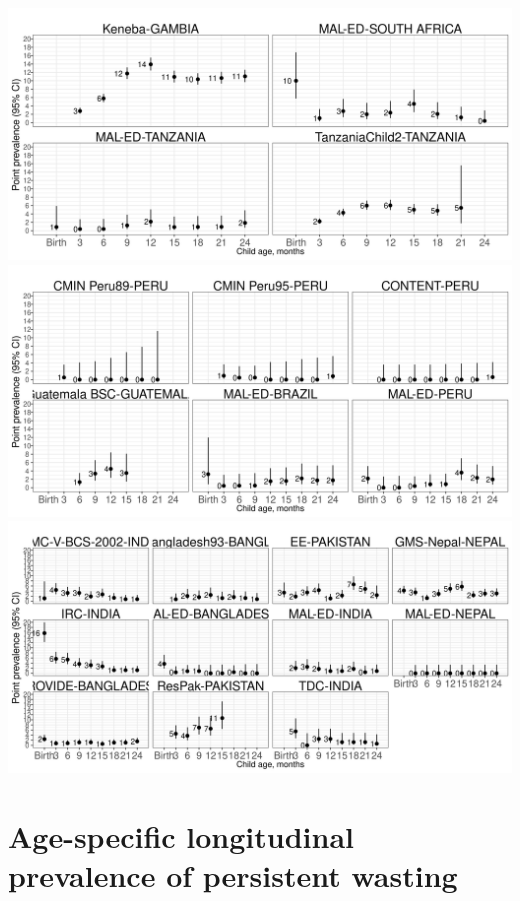 \documentclass[
  9pt,
]{book}
\begin{document}
\includegraphics[width=41.67in]{figures//wasting/fig-sevwast_plot_africa}
\includegraphics[width=41.67in]{figures//wasting/fig-sevwast_plot_lam}
\includegraphics[width=41.67in]{figures//wasting/fig-sevwast_plot_sasia}

\hypertarget{age-specific-longitudinal-prevalence-of-persistent-wasting-1}{%
\section{Age-specific longitudinal prevalence of persistent wasting}\label{age-specific-longitudinal-prevalence-of-persistent-wasting-1}}
\end{document}
